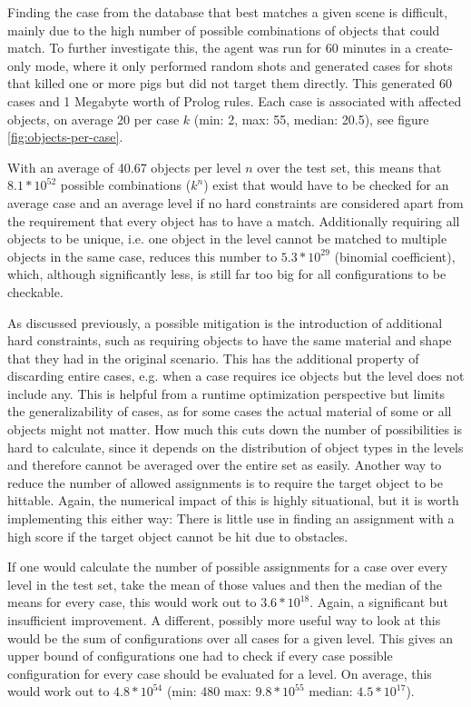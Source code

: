 Finding the case from the database that best matches a given scene is difficult, mainly due to the high number of possible combinations of objects that could match.
To further investigate this, the agent was run for 60 minutes in a create-only mode, where it only performed random shots and generated cases for shots that killed one or more pigs but did not target them directly.
This generated 60 cases and 1 Megabyte worth of Prolog rules. Each case is associated with affected objects, on average 20 per case $k$ (min: 2, max: 55, median: 20.5), see figure \ref{fig:objects-per-case}.

With an average of 40.67 objects per level $n$ over the test set, this means that
$8.1*10^{52}$ possible combinations ($k^n$) exist that would have to be checked for an average case and an average level if no hard constraints are considered apart from the requirement that every object has to have a match.
Additionally requiring all objects to be unique, i.e. one object in the level cannot be matched to multiple objects in the same case, reduces this number to
$5.3*10^{29}$ (binomial coefficient), which, although significantly less, is still far too big for all configurations to be checkable.


As discussed previously, a possible mitigation is the introduction of additional hard constraints, such as requiring objects to have the same material and shape that they had in the original scenario.
This has the additional property of discarding entire cases, e.g. when a case requires ice objects but the level does not include any.
This is helpful from a runtime optimization perspective but limits the generalizability of cases, as for some cases the actual material of some or all objects might not matter.
How much this cuts down the number of possibilities is hard to calculate, since it depends on the distribution of object types in the levels and therefore cannot be averaged over the entire set as easily.
Another way to reduce the number of allowed assignments is to require the target object to be hittable.
Again, the numerical impact of this is highly situational, but it is worth implementing this either way:
There is little use in finding an assignment with a high score if the target object cannot be hit due to obstacles.

If one would calculate the number of possible assignments for a case over every level in the test set, take the mean of those values and then the median of the means for every case, this would work out to $3.6*10^{18}$. Again, a significant but insufficient improvement.
A different, possibly more useful way to look at this would be the sum of configurations over all cases for a given level. This gives an upper bound of configurations one had to check if every case possible configuration for every case should be evaluated for a level. On average, this would work out to $4.8*10^{54}$ (min: 480 max: $9.8*10^{55}$ median: $4.5*10^{17}$).

